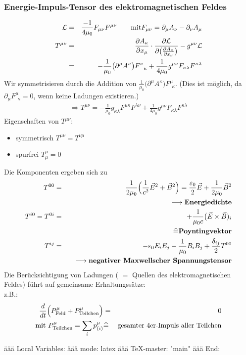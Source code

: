 \subsubsection{Energie-Impuls-Tensor des elektromagnetischen Feldes}
\begin{eqnarray*} 
\Lr \g \frac {- 1} {4\mu_0} F_{\mu\nu}F^ {\mu\nu} \qquad \text{mit} F_{\mu\nu} = \partial_{\mu}A_{\nu} - \partial_{\nu}A_{\mu}\\
T^ {\mu\nu } \g \frac{\partial A_{\kappa}}{\partial x_{\mu }} \cdot \frac{\partial \Lr}{\partial \big(\frac{\partial A_{\kappa}}{\partial x_{\nu}}\big )} - g^ {\mu\nu} \Lr\\
\g - \frac 1 {\mu_0} \big(\partial^ {\mu}A^ {\kappa}\big)F^ {\nu}_{\ \ \kappa} + \frac 1 {4 \mu_0}g^ {\mu\nu}F_{\kappa\lambda}F^ {\kappa\lambda}
\end{eqnarray*}
Wir symmetrisieren durch die Addition von $\frac 1 {\mu_0} \big( \partial^\mu A^\kappa\big ) F^\mu_{\ \ \kappa}$. (Dies ist möglich, da $\partial_{\mu}F^ {\mu}_{\ \ \kappa} = 0$, wenn keine Ladungen existieren.)
\begin{eqnarray*}
\Longrightarrow \boxed{T^ {\mu\nu} = -\frac1 {\mu_0}g_{\kappa \lambda }F^ {\mu\kappa}F^{\lambda \nu} + \frac 1 {4 \mu_0} g^ {\mu\nu}F_{\kappa\lambda}F^ {\kappa\lambda} }\end{eqnarray*}
Eigenschaften von $T^ {\mu\nu}$:
\begin{itemize}
\item symmetrisch $T^{\mu \nu} = T^{\nu\mu}$
\item spurfrei $T_{\mu}^ {\mu}= 0$
\end{itemize}
Die Komponenten ergeben sich zu
\begin{eqnarray*}
T^ {00} &=& \frac 1 {2\mu_0} \Big ( \frac 1 {c^ 2} \vec E ^ 2 + \vec B ^ 2\Big) = \frac{\varepsilon_0}2 \vec E + \frac 1 {2 \mu_0} \vec B ^ 2\\ &{}& \quad \longrightarrow \text{\bf Energiedichte}\\
T^{i0}=T^ {0i} &=& + \frac 1 {\mu_0 c} \big ( \vec E\times \vec B) _i \\
&{}& \quad  \widehat = \text{\bf Poyntingvektor}\\
T^ {ij} &=& -\varepsilon_0  E_iE_j - \frac 1 {\mu_0}B_iB_j + \frac{\delta_{ij}}2 T^ {00} \\  &{}& \quad  \longrightarrow\text{\bf negativer Maxwellscher Spannungstensor}
\end{eqnarray*}
Die Berücksichtigung von Ladungen ( $=$ Quellen des elektromagnetischen Feldes) führt auf gemeinsame Erhaltungssätze:\\
z.B.:
\begin{eqnarray*} \frac d{dt} \Big( P^{\mu}_{\text{Feld}} + P_{\text{Teilchen}}^ {\mu}\Big ) &=& 0\\
\text{mit } P^ {\mu}_{\text{Teilchen}} = \sum  \limits_i p_{(i)}^ {\mu} &\widehat=& \text {gesamter 4er-Impuls aller Teilchen}
\end{eqnarray*}


äää Local Variables: 
äää mode: latex
äää TeX-master: "main"
äää End: 
